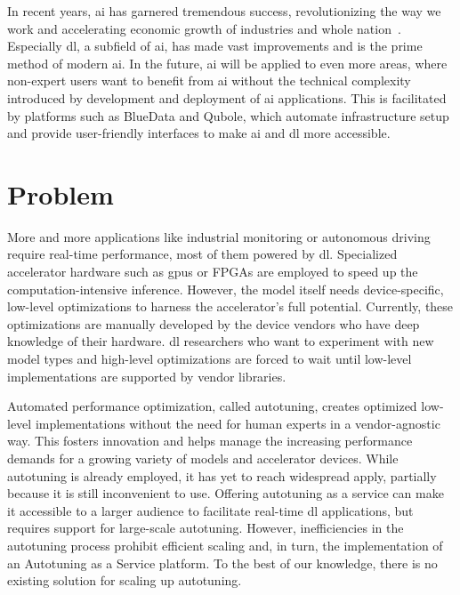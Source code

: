 In recent years, \gls{ai} has garnered tremendous success, revolutionizing the way we work and accelerating economic growth  of industries and whole nation~\cite[p.~15~ff.]{Statista.2019}. Especially \gls{dl}, a subfield of \gls{ai}, has made vast improvements and is the prime method of modern \gls{ai}. In the future, \gls{ai} will be applied to even more areas, where non-expert users want to benefit from \gls{ai} without the technical complexity introduced by development and deployment of \gls{ai} applications. This is facilitated by platforms such as BlueData and Qubole, which automate infrastructure setup and provide user-friendly interfaces to make \gls{ai} and \gls{dl} more accessible. 

\section{Problem}
More and more applications like industrial monitoring or autonomous driving require real-time performance, most of them powered by \gls{dl}. Specialized accelerator hardware such as \glspl{gpu} or FPGAs are employed to speed up the computation-intensive inference. However, the model itself needs device-specific, low-level optimizations to harness the accelerator's full potential. Currently, these optimizations are manually developed by the device vendors who have deep knowledge of their hardware. \gls{dl} researchers who want to experiment with new model types and high-level optimizations are forced to wait until low-level implementations are supported by vendor libraries.

Automated performance optimization, called autotuning, creates optimized low-level implementations without the need for human experts in a vendor-agnostic way. This fosters innovation and helps manage the increasing performance demands for a growing variety of models and accelerator devices. While autotuning is already employed, it has yet to reach widespread apply, partially because it is still inconvenient to use. Offering autotuning as a service can make it accessible to a larger audience to facilitate real-time \gls{dl} applications, but requires support for large-scale autotuning. However, inefficiencies in the autotuning process prohibit efficient scaling and, in turn, the implementation of an Autotuning as a Service platform. To the best of our knowledge, there is no existing solution for scaling up autotuning.

